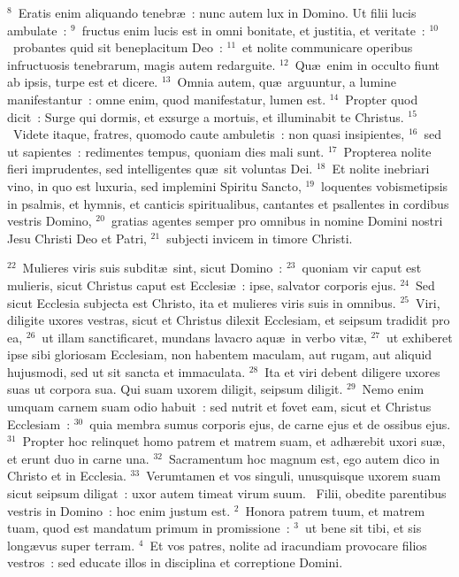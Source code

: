 ${}^{8}$~Eratis enim aliquando tenebr\ae~: nunc autem lux in Domino. Ut filii lucis ambulate~:
${}^{9}$~fructus enim lucis est in omni bonitate, et justitia, et veritate~:
${}^{10}$~probantes quid sit beneplacitum Deo~:
${}^{11}$~et nolite communicare operibus infructuosis tenebrarum, magis autem redarguite.
${}^{12}$~Qu\ae\ enim in occulto fiunt ab ipsis, turpe est et dicere.
${}^{13}$~Omnia autem, qu\ae\ arguuntur, a lumine manifestantur~: omne enim, quod manifestatur, lumen est.
${}^{14}$~Propter quod dicit~: Surge qui dormis, et exsurge a mortuis, et illuminabit te Christus.
${}^{15}$~Videte itaque, fratres, quomodo caute ambuletis~: non quasi insipientes,
${}^{16}$~sed ut sapientes~: redimentes tempus, quoniam dies mali sunt.
${}^{17}$~Propterea nolite fieri imprudentes, sed intelligentes qu\ae\ sit voluntas Dei.
${}^{18}$~Et nolite inebriari vino, in quo est luxuria, sed implemini Spiritu Sancto,
${}^{19}$~loquentes vobismetipsis in psalmis, et hymnis, et canticis spiritualibus, cantantes et psallentes in cordibus vestris Domino,
${}^{20}$~gratias agentes semper pro omnibus in nomine Domini nostri Jesu Christi Deo et Patri,
${}^{21}$~subjecti invicem in timore Christi.


${}^{22}$~Mulieres viris suis subdit\ae\ sint, sicut Domino~:
${}^{23}$~quoniam vir caput est mulieris, sicut Christus caput est Ecclesi\ae~: ipse, salvator corporis ejus.
${}^{24}$~Sed sicut Ecclesia subjecta est Christo, ita et mulieres viris suis in omnibus.
${}^{25}$~Viri, diligite uxores vestras, sicut et Christus dilexit Ecclesiam, et seipsum tradidit pro ea,
${}^{26}$~ut illam sanctificaret, mundans lavacro aqu\ae\ in verbo vit\ae ,
${}^{27}$~ut exhiberet ipse sibi gloriosam Ecclesiam, non habentem maculam, aut rugam, aut aliquid hujusmodi, sed ut sit sancta et immaculata.
${}^{28}$~Ita et viri debent diligere uxores suas ut corpora sua. Qui suam uxorem diligit, seipsum diligit.
${}^{29}$~Nemo enim umquam carnem suam odio habuit~: sed nutrit et fovet eam, sicut et Christus Ecclesiam~:
${}^{30}$~quia membra sumus corporis ejus, de carne ejus et de ossibus ejus.
${}^{31}$~Propter hoc relinquet homo patrem et matrem suam, et adh\ae rebit uxori su\ae , et erunt duo in carne una.
${}^{32}$~Sacramentum hoc magnum est, ego autem dico in Christo et in Ecclesia.
${}^{33}$~Verumtamen et vos singuli, unusquisque uxorem suam sicut seipsum diligat~: uxor autem timeat virum suum.
~Filii, obedite parentibus vestris in Domino~: hoc enim justum est.
${}^{2}$~Honora patrem tuum, et matrem tuam, quod est mandatum primum in promissione~:
${}^{3}$~ut bene sit tibi, et sis long\ae vus super terram.
${}^{4}$~Et vos patres, nolite ad iracundiam provocare filios vestros~: sed educate illos in disciplina et correptione Domini.


